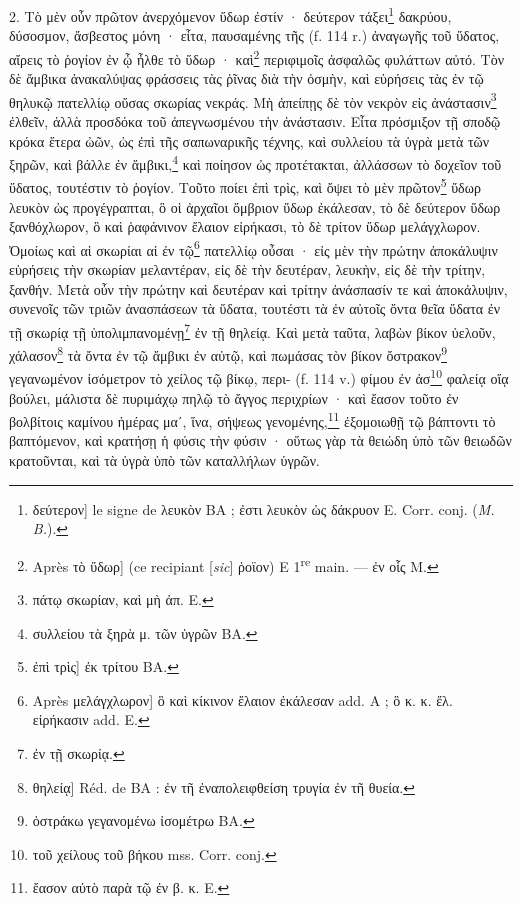 \documentclass[a4paper, 11pt, oneside, polutonikogreek, french]{article}
\begin{document}
2. Τὸ μὲν οὖν πρῶτον ἀνερχόμενον ὕδωρ ἐστίν · δεύτερον τάξει\footnote{δεύτερον] le signe de λευκὸν BA ; ἐστι λευκὸν ὡς δάκρυον E. Corr. conj. (\emph{M. B.}).} δακρύου, δύσοσμον, ἄσβεστος μόνη · εἶτα, παυσαμένης τῆς (f. 114 r.) ἀναγωγῆς τοῦ ὕδατος, αἴρεις τὸ ῥογίον ἐν ᾦ ἦλθε τὸ ὕδωρ · καὶ\footnote{Après τὸ ὕδωρ] (ce recipiant [\emph{sic}] ῥοϊον) E 1\textsuperscript{re} main. --- ἐν οἷς M.} περιφιμοῖς ἀσφαλῶς φυλάττων αὐτό. Τὸν δὲ ἄμβικα ἀνακαλύψας φράσσεις τὰς ῥῖνας διὰ τὴν ὀσμὴν, καὶ εὑρήσεις τὰς ἐν τῷ θηλυκῷ πατελλίῳ οὔσας σκωρίας νεκράς. Μὴ ἀπείπῃς δὲ τὸν νεκρὸν εἰς ἀνάστασιν\footnote{πάτῳ σκωρίαν, καὶ μὴ ἀπ. E.} ἐλθεῖν, ἀλλὰ προσδόκα τοῦ ἀπεγνωσμένου τὴν ἀνάστασιν. Εἶτα πρόσμιξον τῇ σποδῷ κρόκα ἕτερα ὠῶν, ὡς ἐπὶ τῆς σαπωναρικῆς τέχνης, καὶ συλλείου τὰ ὑγρὰ μετὰ τῶν ξηρῶν, καὶ βάλλε ἐν ἄμβικι,\footnote{συλλείου τὰ ξηρὰ μ. τῶν ὑγρῶν BA.} καὶ ποίησον ὠς προτέτακται, ἀλλάσσων τὸ δοχεῖον τοῦ ὕδατος, τουτέστιν τὸ ῥογίον. Τοῦτο ποίει ἐπὶ τρὶς, καὶ ὄψει τὸ μὲν πρῶτον\footnote{ἐπὶ τρὶς] ἐκ τρίτου BA.} ὕδωρ λευκὸν ὡς προγέγραπται, ὃ οἱ ἀρχαῖοι ὄμβριον ὕδωρ ἐκάλεσαν, τὸ δὲ δεύτερον ὕδωρ ξανθόχλωρον, ὃ καὶ ῥαφάνινον ἔλαιον εἰρήκασι, τὸ δὲ τρίτον ὕδωρ μελάγχλωρον. Ὀμοίως καὶ αἱ σκωρίαι αἱ ἐν τῷ\footnote{Après μελάγχλωρον] ὃ καὶ κίκινον ἔλαιον ἐκάλεσαν add. A ; ὃ κ. κ. ἔλ. εἰρήκασιν add. E.} πατελλίῳ οὖσαι · εἰς μὲν τὴν πρώτην ἀποκάλυψιν εὑρήσεις τὴν σκωρίαν μελαντέραν, εἰς δὲ τὴν δευτέραν, λευκὴν, εἰς δὲ τὴν τρίτην, ξανθήν. Μετὰ οὖν τὴν πρώτην καὶ δευτέραν καὶ τρίτην ἀνάσπασίν τε καὶ ἀποκάλυψιν, συνενοῖς τῶν τριῶν ἀνασπάσεων τὰ ὕδατα, τουτέστι τὰ ἐν αὐτοῖς ὄντα θεῖα ὕδατα ἐν τῇ σκωρίᾳ τῇ ὑπολιμπανομένῃ\footnote{ἐν τῇ σκωρίᾳ.} ἐν τῇ θηλείᾳ. Καὶ μετὰ ταῦτα, λαβὼν βίκον ὑελοῦν, χάλασον\footnote{θηλείᾳ] Réd. de BA : ἐν τῆ ἐναπολειφθείση τρυγία ἐν τῆ θυεία.} τὰ ὄντα ἐν τῷ ἄμβικι ἐν αὐτῷ, καὶ πωμάσας τὸν βίκον ὄστρακον\footnote{ὀστράκω γεγανομένω ἰσομέτρω BA.} γεγανωμένον ἰσόμετρον τὸ χείλος τῷ βίκῳ, περι- (f. 114 v.) φίμου ἐν ἀσ\footnote{τοῦ χείλους τοῦ βήκου mss. Corr. conj.} φαλείᾳ οἵᾳ βούλει, μάλιστα δὲ πυριμάχῳ πηλῷ τὸ ἄγγος περιχρίων · καὶ ἔασον τοῦτο ἐν βολβίτοις καμίνου ἡμέρας μαʹ, ἵνα, σήψεως γενομένης,\footnote{ἔασον αὐτὸ παρὰ τῷ ἐν β. κ. E.} ἐξομοιωθῇ τῷ βάπτοντι τὸ βαπτόμενον, καὶ κρατήσῃ ἡ φύσις τὴν φύσιν · οὕτως γὰρ τὰ θειώδη ὑπὸ τῶν θειωδῶν κρατοῦνται, καὶ τὰ ὑγρὰ ὑπὸ τῶν καταλλήλων ὑγρῶν.
\end{document}
